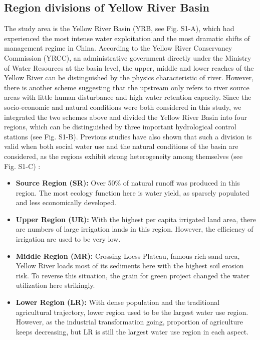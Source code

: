 \documentclass[9pt,twoside,lineno]{pnas-new}
\begin{document}
\subsection*{Region divisions of Yellow River Basin}
The study area is the Yellow River Basin (YRB, see Fig. S1-A), which had experienced the most intense water exploitation and the most dramatic shifts of management regime in China.
According to the Yellow River Conservancy Commission (YRCC), an administrative government directly under the Ministry of Water Resources at the basin level, the upper, middle and lower reaches of the Yellow River can be distinguished by the physics characteristic of river.
However, there is another scheme suggesting that the upstream only refers to river source areas with little human disturbance and high water retention capacity.
Since the socio-economic and natural conditions were both considered in this study, we integrated the two schemes above and divided the Yellow River Basin into four regions, which can be distinguished by three important hydrological control stations (see Fig. S1-B).
Previous studies have also shown that such a division is valid when both social water use and the natural conditions of the basin are considered, as the regions exhibit strong heterogeneity among themselves (see Fig. S1-C) \cite{wangYellowRiverWater2019}:

\begin{itemize}
    \item \textbf{Source Region (SR):} Over 50\% of natural runoff was produced in this region. The most ecology function here is water yield, as sparsely populated and less economically developed.
    \item \textbf{Upper Region (UR):} With the highest per capita irrigated land area, there are numbers of large irrigation lands in this region. However, the efficiency of irrigation are used to be very low.
    \item \textbf{Middle Region (MR):} Crossing Loess Plateau, famous rich-sand area, Yellow River loads most of its sediments here with the highest soil erosion risk. To reverse this situation, the grain for green project changed the water utilization here strikingly.
    \item \textbf{Lower Region (LR):} With dense population and the traditional agricultural trajectory, lower region used to be the largest water use region. However, as the industrial transformation going, proportion of agriculture keeps decreasing, but LR is still the largest water use region in each aspect.
\end{itemize}
\end{document}
